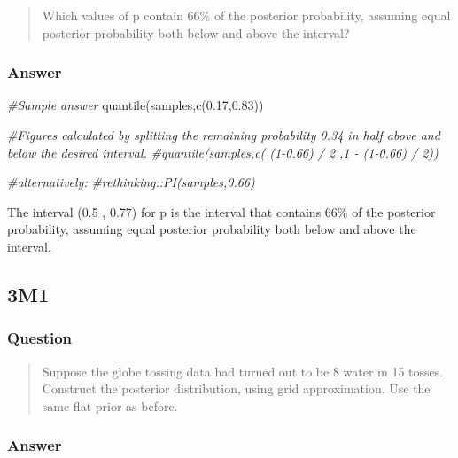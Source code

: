 \documentclass[
]{book}
\newenvironment{Shaded}{\begin{snugshade}}{\end{snugshade}}
\newcommand{\CommentTok}[1]{\textcolor[rgb]{0.56,0.35,0.01}{\textit{#1}}}
\newcommand{\FloatTok}[1]{\textcolor[rgb]{0.00,0.00,0.81}{#1}}
\newcommand{\FunctionTok}[1]{\textcolor[rgb]{0.00,0.00,0.00}{#1}}
\newcommand{\NormalTok}[1]{#1}
\begin{document}
\begin{quote}
Which values of p contain 66\% of the posterior probability, assuming equal posterior probability both below and above the interval?
\end{quote}

\hypertarget{answer-21}{%
\subsubsection*{Answer}\label{answer-21}}

\begin{Shaded}
\begin{Highlighting}[]
\CommentTok{\#Sample answer}
\FunctionTok{quantile}\NormalTok{(samples,}\FunctionTok{c}\NormalTok{(}\FloatTok{0.17}\NormalTok{,}\FloatTok{0.83}\NormalTok{))}

\CommentTok{\#Figures calculated by splitting the remaining probability 0.34 in half above and below the desired interval.}
\CommentTok{\#quantile(samples,c( (1{-}0.66) / 2 ,1 {-} (1{-}0.66) / 2))}

\CommentTok{\#alternatively:}
\CommentTok{\#rethinking::PI(samples,0.66)}
\end{Highlighting}
\end{Shaded}

The interval (0.5 , 0.77) for p is the interval that contains 66\% of the posterior probability, assuming equal posterior probability both below and above the interval.

\hypertarget{m1-1}{%
\subsection*{3M1}\label{m1-1}}

\hypertarget{question-22}{%
\subsubsection*{Question}\label{question-22}}

\begin{quote}
Suppose the globe tossing data had turned out to be 8 water in 15 tosses. Construct the posterior distribution, using grid approximation. Use the same flat prior as before.
\end{quote}

\hypertarget{answer-22}{%
\subsubsection*{Answer}\label{answer-22}}
\end{document}
